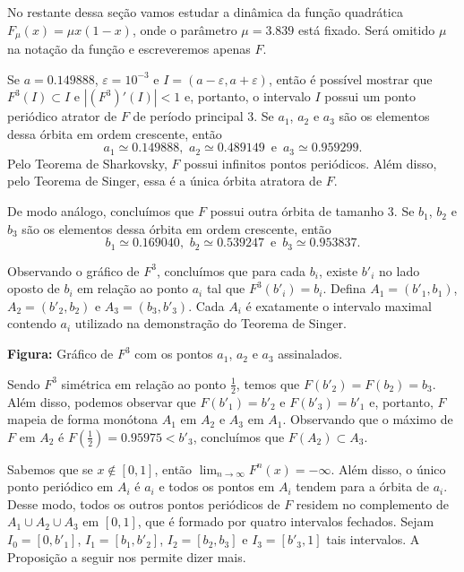 No restante dessa seção vamos estudar a dinâmica da função quadrática $F_\mu(x) = \mu x(1-x)$, onde o parâmetro $\mu = 3.839$ está fixado. Será omitido $\mu$ na notação da função e escreveremos apenas $F$.

Se $a = 0.149888$, $\varepsilon = 10^{-3}$ e $I = (a - \varepsilon, a + \varepsilon)$, então é possível mostrar que $F^3(I) \subset I$ e $|(F^3)'(I)| < 1$ e, portanto, o intervalo $I$ possui um ponto periódico atrator de $F$ de período principal $3$. Se $a_1$, $a_2$ e $a_3$ são os elementos dessa órbita em ordem crescente, então
$$a_1 \simeq 0.149888 \text{, } \, a_2 \simeq 0.489149 \, \text{ e } \, a_3 \simeq 0.959299.$$
Pelo Teorema de Sharkovsky, $F$ possui infinitos pontos periódicos. Além disso, pelo Teorema de Singer, essa é a única órbita atratora de $F$.

De modo análogo, concluímos que $F$ possui outra órbita de tamanho $3$. Se $b_1$, $b_2$ e $b_3$ são os elementos dessa órbita em ordem crescente, então
$$b_1 \simeq 0.169040 \text{, } \, b_2 \simeq 0.539247 \,  \text{ e } \, b_3 \simeq 0.953837.$$

Observando o gráfico de $F^3$, concluímos que para cada $b_i$, existe $b'_i$ no lado oposto de $b_i$ em relação ao ponto $a_i$ tal que $F^3(b'_i) = b_i$. Defina $A_1 = (b'_1, b_1)$, $A_2 = (b'_2, b_2)$ e $A_3 = (b_3, b'_3)$. Cada $A_i$ é exatamente o intervalo maximal contendo $a_i$ utilizado na demonstração do Teorema de Singer.

\begin{center}
{\small \textbf{Figura:} Gráfico de $F^3$ com os pontos $a_1$, $a_2$ e $a_3$ assinalados.}
\end{center}

Sendo $F^3$ simétrica em relação ao ponto $\frac{1}{2}$, temos que $F(b'_2) = F(b_2) = b_3$.
Além disso, podemos observar que $F(b'_1) = b'_2$ e $F(b'_3) = b'_1$ e, portanto, $F$ mapeia de forma monótona $A_1$ em $A_2$ e $A_3$ em $A_1$. Observando que o máximo de $F$ em $A_2$ é $F( \frac{1}{2}) = 0.95975 < b'_3$, concluímos que $F(A_2) \subset A_3$.

Sabemos que se $x \notin [0, 1]$, então $\lim_{n \to \infty} F^n(x) = -\infty$.
Além disso, o único ponto periódico em $A_i$ é $a_i$ e todos os pontos em $A_i$ tendem para a órbita de $a_i$.
Desse modo, todos os outros pontos periódicos de $F$ residem no complemento de $A_1 \cup A_2 \cup A_3$ em $[0, 1]$, que é formado por quatro intervalos fechados. Sejam $I_0 = [0, b'_1]$, $I_1 = [b_1, b'_2]$, $I_2 = [b_2, b_3]$ e $I_3 = [b'_3, 1]$ tais intervalos. A Proposição a seguir nos permite dizer mais.

